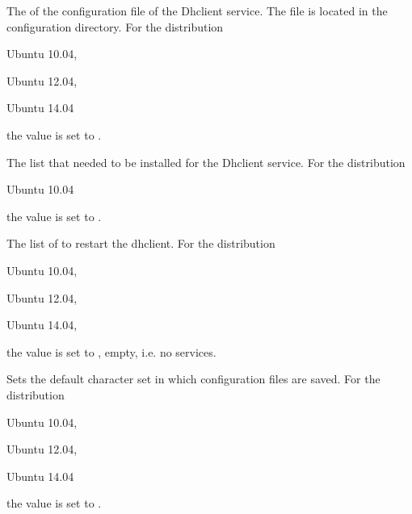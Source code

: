 
The  of the configuration file of the Dhclient service. 
The file is located in the configuration directory.
For the distribution
\begin{inparaitem}
\item[\TheDistribution{ubuntu}] Ubuntu 10.04,
\item[\TheDistribution{ubuntu}] Ubuntu 12.04,
\item[\TheDistribution{ubuntu}] Ubuntu 14.04
\end{inparaitem}
the value is set to .


The  list that needed to be installed for the Dhclient service.
For the distribution
\begin{inparaitem}
\item[\TheDistribution{ubuntu}] Ubuntu 10.04
\end{inparaitem}
the value is set to .


The list of  to restart the dhclient.
For the distribution
\begin{inparaitem}
\item[\TheDistribution{ubuntu}] Ubuntu 10.04,
\item[\TheDistribution{ubuntu}] Ubuntu 12.04,
\item[\TheDistribution{ubuntu}] Ubuntu 14.04,
\end{inparaitem}
the value is set to \qcode{}, empty, i.e. no services.


Sets the default character set  in which configuration files are 
saved. For the distribution
\begin{inparaitem}
\item[\TheDistribution{ubuntu}] Ubuntu 10.04,
\item[\TheDistribution{ubuntu}] Ubuntu 12.04,
\item[\TheDistribution{ubuntu}] Ubuntu 14.04
\end{inparaitem}
the value is set to .

